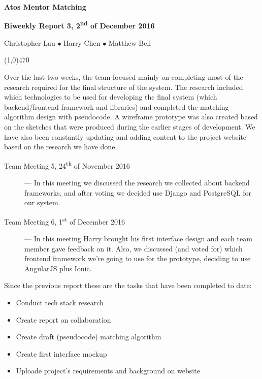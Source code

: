 \documentclass[11pt]{report}
\begin{document}
\centerline{{\LARGE \bf Atos Mentor Matching}}

\centerline{ \large \bf Biweekly Report 3, 2\textsuperscript{nd} of December 2016}
\centerline{ Christopher Lau $\bullet$ Harry Chen $\bullet$ Matthew Bell }
\noindent
\line(1,0){470}\\


\smallskip

\noindent
Over the last two weeks, the team focused mainly on completing most of the research required for the final structure of the system. The research included which technologies to be used for developing the final system (which backend/frontend framework and libraries) and completed the matching algorithm design with pseudocode. A wireframe prototype was also created based on the sketches that were produced during the earlier stages of development. We have also been constantly updating and adding content to the project website based on the research we have done.

\bigskip
{}
\smallskip


\begin{description}
  \item[Team Meeting 5, 24\textsuperscript{th} of November 2016] --- In this meeting we discussed the research we collected about backend frameworks, and after voting we decided use Django and PostgreSQL for our system.
  \item[Team Meeting 6, 1\textsuperscript{st} of December 2016] --- In this meeting Harry brought his first interface design and each team member gave feedback on it. Also, we discussed (and voted for) which frontend framework we're going to use for the prototype, deciding to use AngularJS plus Ionic.
\end{description}

\bigskip
{}
\smallskip

\noindent
Since the previous report these are the tasks that have been completed to date:
\begin{itemize}
    \item Conduct tech stack research
    \item Create report on collaboration
    \item Create draft (pseudocode) matching algorithm
    \item Create first interface mockup
    \item Uploade project’s requirements and background on website
\end{itemize}
\end{document}
